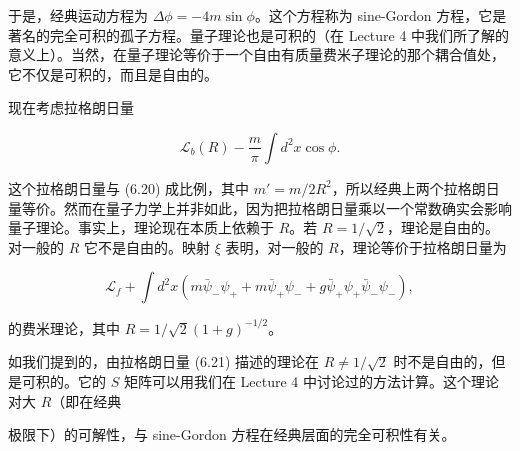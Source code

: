 于是，经典运动方程为 $\Delta\phi=-4m\sin\phi$。这个方程称为 sine-Gordon 方程，它是著名的完全可积的孤子方程。量子理论也是可积的（在 Lecture 4 中我们所了解的意义上）。当然，在量子理论等价于一个自由有质量费米子理论的那个耦合值处，它不仅是可积的，而且是自由的。

现在考虑拉格朗日量

\begin{equation}
  \tag{6.21}
  \label{eq:6-21}
  \mathcal{L}_b(R)-\frac{m}{\pi}\int d^2x\cos\phi.
\end{equation}

这个拉格朗日量与 (6.20) 成比例，其中 $m'=m/2R^2$，所以经典上两个拉格朗日量等价。然而在量子力学上并非如此，因为把拉格朗日量乘以一个常数确实会影响量子理论。事实上，理论现在本质上依赖于 $R$。若 $R=1/\sqrt2$，理论是自由的。对一般的 $R$ 它不是自由的。映射 $\xi$ 表明，对一般的 $R$，理论等价于拉格朗日量为

\begin{equation}
  \tag{6.22}
  \label{eq:6-22}
  \mathcal{L}_f+\int d^2x\left(m\bar\psi_-\psi_++m\bar\psi_+\psi_-+g\bar\psi_+\psi_+\bar\psi_-\psi_-\right),
\end{equation}

的费米理论，其中 $R=1/\sqrt2(1+g)^{-1/2}$。



如我们提到的，由拉格朗日量 (6.21) 描述的理论在 $R\ne1/\sqrt2$ 时不是自由的，但是可积的。它的 $S$ 矩阵可以用我们在 Lecture 4 中讨论过的方法计算。这个理论对大 $R$（即在经典

极限下）的可解性，与 sine-Gordon 方程在经典层面的完全可积性有关。

